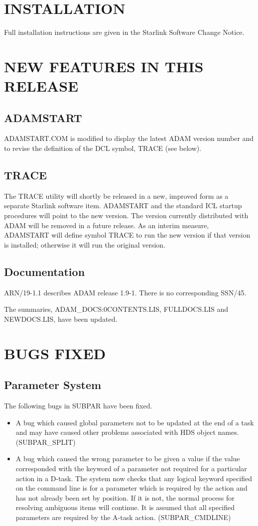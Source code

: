 \section{INSTALLATION}
Full installation instructions are given in the Starlink Software 
Change Notice.

\section{NEW FEATURES IN THIS RELEASE}


\subsection{ADAMSTART}
ADAMSTART.COM is modified to display the latest ADAM version number
and to revise the definition of the DCL symbol, TRACE (see below).

\subsection{TRACE}
The TRACE utility will shortly be released in a new, improved form as
a separate Starlink software item.
ADAMSTART and the standard ICL startup procedures will point to the new 
version.
The version currently distributed with ADAM will be removed in a future
release.
As an interim measure, ADAMSTART will define symbol TRACE to run the new version
if that version is installed; otherwise it will run the original version.

\subsection{Documentation}
ARN/19-1.1 describes ADAM release 1.9-1.
There is no corresponding SSN/45.

The summaries, ADAM\_DOCS:0CONTENTS.LIS, FULLDOCS.LIS and NEWDOCS.LIS, have 
been updated. 

\section{BUGS FIXED}

\subsection{Parameter System}
The following bugs in SUBPAR have been fixed.
\begin{itemize}
\item A bug which caused global parameters not to be updated at the end of a 
task and may have caused other problems associated with HDS object names.
(SUB\-PAR\_\-SPLIT)
\item A bug which caused the wrong parameter to be given a value if the
value corresponded with the keyword of a parameter not required for a
particular action in a D-task.
The system now checks that any logical keyword specified on the command
line is for a parameter which is required by the action and has not already
been set by position.
If it is not, the normal process for resolving ambiguous items will continue.
It is assumed that all specified parameters are required by the A-task action.
(SUB\-PAR\_\-CMD\-LINE) 
\end{itemize}

